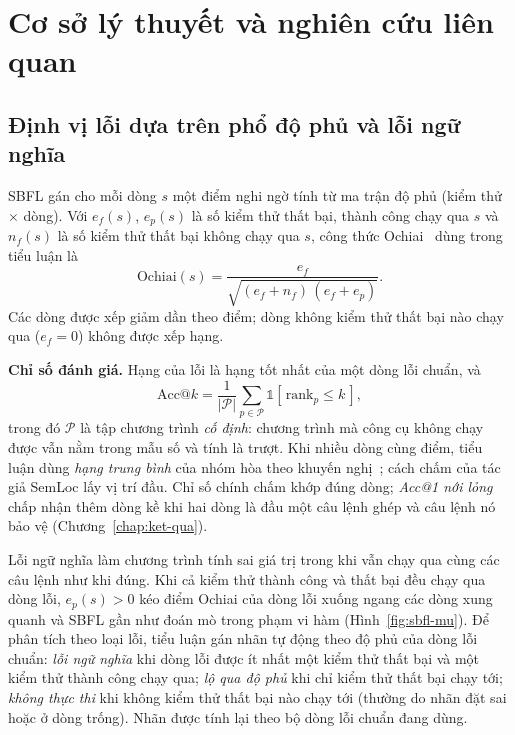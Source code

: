 \chapter{Cơ sở lý thuyết và nghiên cứu liên quan}
\label{chap:co-so}

\section{Định vị lỗi dựa trên phổ độ phủ và lỗi ngữ nghĩa}
\label{sec:sbfl}

SBFL gán cho mỗi dòng $s$ một điểm nghi ngờ tính từ ma trận độ phủ (kiểm thử $\times$ dòng). Với $e_f(s)$, $e_p(s)$
là số kiểm thử thất bại, thành công chạy qua $s$ và $n_f(s)$ là số kiểm thử thất bại không chạy qua $s$, công thức
Ochiai~\cite{abreu2009} dùng trong tiểu luận là
\begin{equation} \mathrm{Ochiai}(s) = \frac{e_f}{\sqrt{(e_f+n_f)\,(e_f+e_p)}}. \label{eq:ochiai} \end{equation}
Các dòng được xếp giảm dần theo điểm; dòng không kiểm thử thất bại nào chạy qua ($e_f = 0$) không được xếp hạng.

\textbf{Chỉ số đánh giá.} Hạng của lỗi là hạng tốt nhất của một dòng lỗi chuẩn, và
\begin{equation} \mathrm{Acc@}k = \frac{1}{|\mathcal{P}|} \sum_{p \in \mathcal{P}} \mathbb{1}\!\left[\,\mathrm{rank}_p \le k\,\right], \label{eq:acck} \end{equation}
trong đó $\mathcal{P}$ là tập chương trình \emph{cố định}: chương trình mà công cụ không chạy được vẫn nằm trong mẫu số
và tính là trượt. Khi nhiều dòng cùng điểm, tiểu luận dùng \emph{hạng trung bình} của nhóm hòa theo khuyến
nghị~\cite{pearson2017,desouza2016}; cách chấm của tác giả SemLoc lấy vị trí đầu. Chỉ số chính chấm khớp đúng dòng;
\emph{Acc@1 nới lỏng} chấp nhận thêm dòng kề khi hai dòng là đầu một câu lệnh ghép và câu lệnh nó bảo vệ
(Chương~\ref{chap:ket-qua}).

\label{sec:loi-ngu-nghia}%
Lỗi ngữ nghĩa làm chương trình tính sai giá trị trong khi vẫn chạy qua cùng các câu lệnh như khi đúng. Khi cả
kiểm thử thành công và thất bại đều chạy qua dòng lỗi, $e_p(s) > 0$ kéo điểm Ochiai của dòng lỗi xuống ngang các dòng
xung quanh và SBFL gần như đoán mò trong phạm vi hàm (Hình~\ref{fig:sbfl-mu}). Để phân tích theo loại lỗi, tiểu luận gán nhãn tự động theo độ phủ của dòng lỗi chuẩn:
\emph{lỗi ngữ nghĩa} khi dòng lỗi được ít nhất một kiểm thử thất bại và một kiểm thử thành công chạy qua;
\emph{lộ qua độ phủ} khi chỉ kiểm thử thất bại chạy tới; \emph{không thực thi} khi không kiểm thử thất bại nào chạy tới
(thường do nhãn đặt sai hoặc ở dòng trống). Nhãn được tính lại theo bộ dòng lỗi chuẩn đang dùng.

